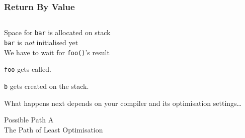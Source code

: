\begin{frame}
  \frametitle{Return By Value}
  \begin{center}
    \begin{columns}
      \column{4cm}
      \column{4cm}
    \end{columns}
  \end{center}
  \vskip2mm
  \begin{overprint}
    \begin{center}
      Space for {\tt bar} is allocated on stack \\
      {\tt bar} is \emph{not} initialised yet \\
      We have to wait for {\tt foo()}'s result
    \end{center}

    \begin{center}
      {\tt foo} gets called.
    \end{center}

    \begin{center}
      {\tt b} gets created on the stack.
    \end{center}

    \begin{center}
      What happens next depends on your compiler and its optimisation settings\dots
    \end{center}
  \end{overprint}
\end{frame}

\begin{frame}
  \begin{center} \Huge
    Possible Path A \\[4mm]
    The Path of Least Optimisation
  \end{center}
\end{frame}

